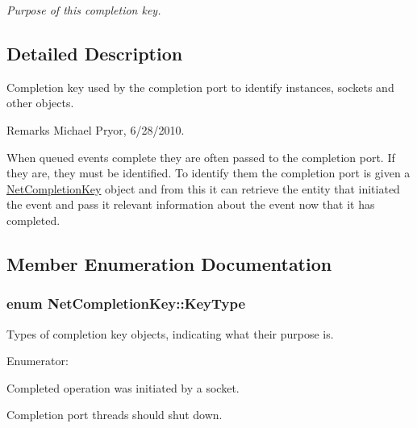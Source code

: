 \begin{DoxyCompactItemize}
\begin{DoxyCompactList}\small\item\em Purpose of this completion key. \item\end{DoxyCompactList}\end{DoxyCompactItemize}


\subsection{Detailed Description}
Completion key used by the completion port to identify instances, sockets and other objects. \begin{DoxyRemark}{Remarks}
Michael Pryor, 6/28/2010.
\end{DoxyRemark}
When queued events complete they are often passed to the completion port. If they are, they must be identified. To identify them the completion port is given a \hyperlink{class_net_completion_key}{NetCompletionKey} object and from this it can retrieve the entity that initiated the event and pass it relevant information about the event now that it has completed. 

\subsection{Member Enumeration Documentation}
\hypertarget{class_net_completion_key_a129b5d89d5f2ac58abcc9872adc85d32}{
\subsubsection[{KeyType}]{\setlength{\rightskip}{0pt plus 5cm}enum {\bf NetCompletionKey::KeyType}}}
\label{class_net_completion_key_a129b5d89d5f2ac58abcc9872adc85d32}


Types of completion key objects, indicating what their purpose is. 

\begin{Desc}
\item[Enumerator: ]\par
\begin{description}
\item[{\em 
\hypertarget{class_net_completion_key_a129b5d89d5f2ac58abcc9872adc85d32aa5938cb8a68c873ecec66e4440597891}{
SOCKET}
\label{class_net_completion_key_a129b5d89d5f2ac58abcc9872adc85d32aa5938cb8a68c873ecec66e4440597891}
}]Completed operation was initiated by a socket. \item[{\em 
\hypertarget{class_net_completion_key_a129b5d89d5f2ac58abcc9872adc85d32a6de0ac39e69b38d1e5b3d89f14168992}{
SHUTDOWN}
\label{class_net_completion_key_a129b5d89d5f2ac58abcc9872adc85d32a6de0ac39e69b38d1e5b3d89f14168992}
}]Completion port threads should shut down. \end{description}
\end{Desc}



